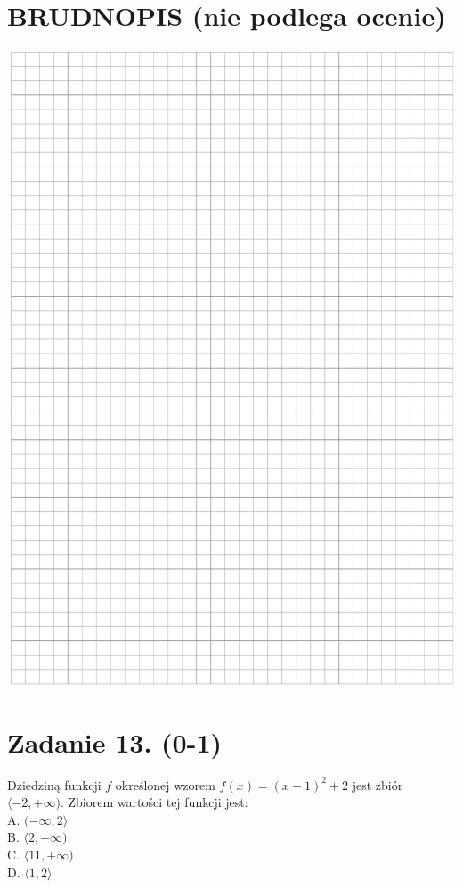 \documentclass[10pt]{article}
\begin{document}
\section*{BRUDNOPIS (nie podlega ocenie)}
\begin{center}
\includegraphics[max width=\textwidth]{2024_11_21_99eb8e6624b497a5af43g-05}
\end{center}

\section*{Zadanie 13. (0-1)}
Dziedziną funkcji \(f\) określonej wzorem \(f(x)=(x-1)^{2}+2\) jest zbiór \(\langle-2,+\infty)\). Zbiorem wartości tej funkcji jest:\\
A. \((-\infty, 2\rangle\)\\
B. \(\langle 2,+\infty)\)\\
C. \(\langle 11,+\infty)\)\\
D. \(\langle 1,2\rangle\)
\end{document}
